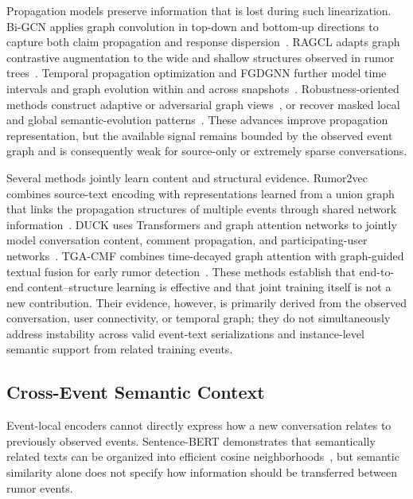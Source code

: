 \documentclass[sigconf,anonymous,review]{../acmart/acmart}
\begin{document}
Propagation models preserve information that is lost during such
linearization. Bi-GCN applies graph convolution in top-down and bottom-up
directions to capture both claim propagation and response
dispersion~\cite{bian2020bigcn}. RAGCL adapts graph contrastive augmentation
to the wide and shallow structures observed in rumor
trees~\cite{cui2024ragcl}. Temporal propagation optimization and FGDGNN
further model time intervals and graph evolution within and across
snapshots~\cite{peng2025temporal,guo2025fgdgnn}. Robustness-oriented methods
construct adaptive or adversarial graph views~\cite{wang2025adaat}, or recover
masked local and global semantic-evolution patterns~\cite{wang2026seegraphmae}.
These advances improve propagation representation, but the available signal
remains bounded by the observed event graph and is consequently weak for
source-only or extremely sparse conversations.

Several methods jointly learn content and structural evidence. Rumor2vec
combines source-text encoding with representations learned from a union graph
that links the propagation structures of multiple events through shared
network information~\cite{tu2021rumor2vec}. DUCK uses Transformers and graph
attention networks to jointly model conversation content, comment
propagation, and participating-user networks~\cite{tian2022duck}. TGA-CMF
combines time-decayed graph attention with graph-guided textual fusion for
early rumor detection~\cite{ding2026tgacmf}. These methods establish that
end-to-end content--structure learning is effective and that joint training
itself is not a new contribution. Their evidence, however, is primarily
derived from the observed conversation, user connectivity, or temporal graph;
they do not simultaneously address instability across valid event-text
serializations and instance-level semantic support from related training
events.

\subsection{Cross-Event Semantic Context}

Event-local encoders cannot directly express how a new conversation relates
to previously observed events. Sentence-BERT demonstrates that semantically
related texts can be organized into efficient cosine
neighborhoods~\cite{reimers2019sbert}, but semantic similarity alone does not
specify how information should be transferred between rumor events.
\end{document}
